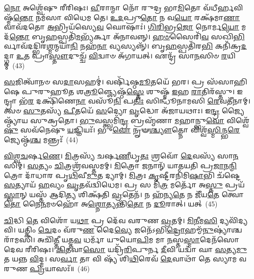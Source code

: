\-\ul{𑌨𑍋} 𑌅𑌶𑍍𑌵𑍇᳴𑌷𑍁 𑌰𑍀𑌰𑌿𑌷𑌃। \ul{𑌵𑍀}\-𑌰𑌾𑌨𑍍𑌮𑌾 𑌨𑍋᳴ 𑌰𑍁𑌦𑍍𑌰 𑌭𑌾\-\ul{𑌮𑌿}\-𑌤𑍋 𑌵᳴𑌧𑍀𑌰𑍍\mbox{}\-\ul{𑌹}\-𑌵𑌿𑌷𑍍𑌮᳴\-\ul{𑌨𑍍𑌤𑍋} 𑌨𑌮᳴𑌸𑌾 𑌵𑌿𑌧𑍇𑌮 𑌤𑍇। \ul{𑌉}\-\-\ul{𑌦}\-𑌪𑍍𑌰𑍁\-\ul{𑌤𑍋} 𑌨 𑌵\-\ul{𑌯𑍋} 𑌰𑌕𑍍𑌷᳴𑌮𑌾\-\ul{𑌣𑌾} 𑌵𑌾𑌵᳴𑌦𑌤𑍋 \ul{𑌅}\-𑌭𑍍𑌰𑌿𑌯᳴𑌸𑍍𑌯𑍇\-\ul{𑌵} 𑌘𑍋𑌷𑌾𑌃॑। \ul{𑌗𑌿}\-\-\ul{𑌰𑌿}\-𑌭𑍍𑌰\-\ul{𑌜𑍋} 𑌨𑍋𑌰𑍍𑌮\-\ul{𑌯𑍋} 𑌮𑌦᳴\-\ul{𑌨𑍍𑌤𑍋} 𑌬𑍃\-\ul{𑌹}\-𑌸𑍍𑌪𑌤𑌿᳴\-\ul{𑌮}\-𑌭𑍍𑌯᳴𑌰𑍍𑌕𑌾 𑌅᳴𑌨𑌾𑌵𑌨𑍍𑌨𑍍। \ul{𑌹}\-\-\ul{𑍞}\-𑌸𑍈𑌰𑌿᳴\-\ul{𑌵} 𑌸𑌖𑌿᳴\-\ul{𑌭𑌿}\-𑌰𑍍𑌵𑌾𑌵᳴𑌦𑌦𑍍𑌭𑌿𑌰\-\ul{𑌶𑍍𑌮}\-𑌨𑍍𑌮𑌯𑌾᳴\-\ul{𑌨𑌿} 𑌨𑌹᳴\-\ul{𑌨𑌾} 𑌵𑍍𑌯𑌸𑍍𑌯𑌨𑍍𑌨𑍍᳴। 𑌬𑍃\-\ul{𑌹}\-𑌸𑍍𑌪𑌤𑌿᳴𑌰\-\ul{𑌭𑌿} 𑌕𑌨𑌿᳴𑌕𑍍𑌰\-\ul{𑌦}\-𑌦𑍍𑌗𑌾 \ul{𑌉}\-𑌤 𑌪𑍍𑌰𑌾\-\ul{𑌸𑍍𑌤𑍗}\-𑌦𑍁𑌚𑍍𑌚᳴ \ul{𑌵𑌿}\-𑌦𑍍𑌵𑌾𑍞 𑌅᳴𑌗𑌾𑌯𑌤𑍍। 𑌏𑌨𑍍𑌦𑍍𑌰᳴ 𑌸𑌾\-\ul{𑌨}\-𑌸𑌿𑍞 \ul{𑌰}\-𑌯𑌿𑌮𑍍~(43)

\-\ul{𑌸}\-𑌜𑌿𑌤𑍍𑌵𑌾᳴𑌨𑍞 𑌸\-\ul{𑌦𑌾}\-𑌸𑌹𑌮𑍍॑। 𑌵𑌰𑍍\mbox{}𑌷𑌿᳴𑌷𑍍𑌠\-\ul{𑌮𑍂}\-𑌤𑌯𑍇᳴ 𑌭𑌰। 𑌪𑍍𑌰 𑌸᳴𑌸𑌾𑌹𑌿𑌷𑍇 𑌪𑍁𑌰𑍁𑌹𑍂\-\ul{𑌤} 𑌶\-\ul{𑌤𑍍𑌰𑍂}\-𑌞𑍍𑌜𑍍𑌯𑍇𑌷𑍍𑌠᳴\-\ul{𑌸𑍍𑌤𑍇} 𑌶𑍁𑌷𑍍𑌮᳴ \ul{𑌇}\-𑌹 \ul{𑌰𑌾}\-𑌤𑌿𑌰᳴𑌸𑍍𑌤𑍁। 𑌇𑌨𑍍𑌦𑍍𑌰𑌾 𑌭᳴\-\ul{𑌰} 𑌦𑌕𑍍𑌷𑌿᳴𑌣𑍇\-\ul{𑌨𑌾} 𑌵𑌸𑍂᳴\-\ul{𑌨𑌿} 𑌪\-\ul{𑌤𑌿𑌃} 𑌸𑌿𑌨𑍍𑌧𑍂᳴𑌨𑌾𑌮𑌸𑌿 \ul{𑌰𑍇}\-𑌵𑌤𑍀᳴𑌨𑌾𑌮𑍍। 𑌤𑍍𑌵𑍞 \ul{𑌸𑍁}\-𑌤𑌸𑍍𑌯᳴ \ul{𑌪𑍀}\-𑌤𑌯𑍇᳴ \ul{𑌸}\-𑌦𑍍𑌯𑍋 \ul{𑌵𑍃}\-𑌦𑍍𑌧𑍋 𑌅᳴𑌜𑌾𑌯𑌥𑌾𑌃। 𑌇\-\ul{𑌨𑍍𑌦𑍍𑌰} 𑌜𑍍𑌯𑍈𑌷𑍍𑌠𑍍𑌯𑌾᳴𑌯 𑌸𑍁𑌕𑍍𑌰𑌤𑍋। \ul{𑌭𑍁}\-𑌵𑌸𑍍𑌤𑍍𑌵𑌮𑌿᳴\-\ul{𑌨𑍍𑌦𑍍𑌰} 𑌬𑍍𑌰𑌹𑍍𑌮᳴𑌣𑌾 \ul{𑌮}\-𑌹𑌾𑌨𑍍𑌭𑍁\-\ul{𑌵𑍋} 𑌵𑌿𑌶𑍍𑌵𑍇᳴\-\ul{𑌷𑍁} 𑌸𑌵᳴𑌨𑍇𑌷𑍁 \ul{𑌯}\-𑌜𑍍𑌞𑌿𑌯𑌃᳴। 𑌭𑍁\-\ul{𑌵𑍋} 𑌨𑍄𑍟\-\ul{𑌶𑍍𑌚𑍍𑌯𑍗}\-𑌤𑍍𑌨𑍋 𑌵𑌿𑌶𑍍𑌵᳴\-\ul{𑌸𑍍𑌮𑌿}\-𑌨𑍍𑌭\-\ul{𑌰𑍇} 𑌜𑍍𑌯𑍇𑌷𑍍𑌠᳴\-\ul{𑌶𑍍𑌚} 𑌮𑌨𑍍𑌤𑍍𑌰𑌃᳴~(44)

\-\ul{𑌵𑌿}\-\-\ul{𑌶𑍍𑌵}\-\-\ul{𑌚}\-𑌰𑍍\mbox{}\-\ul{𑌷}\-\-\ul{𑌣𑍇}\-। \ul{𑌮𑌿}\-𑌤𑍍𑌰𑌸𑍍𑌯᳴ 𑌚𑌰𑍍\mbox{}𑌷\-\ul{𑌣𑍀}\-𑌧𑍃\-\ul{𑌤𑌃} 𑌶𑍍𑌰𑌵𑍋᳴ \ul{𑌦𑍇}\-𑌵𑌸𑍍𑌯᳴ 𑌸𑌾\-\ul{𑌨}\-𑌸𑌿𑌮𑍍। \ul{𑌸}\-𑌤𑍍𑌯𑌂 \ul{𑌚𑌿}\-𑌤𑍍𑌰𑌶𑍍𑌰᳴𑌵𑌸𑍍𑌤𑌮𑌮𑍍। \ul{𑌮𑌿}\-𑌤𑍍𑌰𑍋 𑌜𑌨𑌾𑌨𑍍᳴ 𑌯𑌾𑌤𑌯𑌤𑌿 𑌪𑍍𑌰\-\ul{𑌜𑌾}\-𑌨\-\ul{𑌨𑍍𑌮𑌿}\-𑌤𑍍𑌰𑍋 𑌦𑌾᳴𑌧𑌾𑌰 𑌪𑍃\-\ul{𑌥𑌿}\-𑌵𑍀\-\ul{𑌮𑍁}\-𑌤 𑌦𑍍𑌯𑌾𑌮𑍍। \ul{𑌮𑌿}\-𑌤𑍍𑌰𑌃 \ul{𑌕𑍃}\-𑌷𑍍𑌟𑍀𑌰𑌨𑌿᳴𑌮𑌿\-\ul{𑌷𑌾}\-𑌭𑌿 𑌚᳴𑌷𑍍𑌟𑍇 \ul{𑌸}\-𑌤𑍍𑌯𑌾𑌯᳴ \ul{𑌹}\-𑌵𑍍𑌯𑌂 \ul{𑌘𑍃}\-𑌤𑌵᳴𑌦𑍍𑌵𑌿𑌧𑍇𑌮। 𑌪𑍍𑌰 𑌸 𑌮𑌿᳴\-\ul{𑌤𑍍𑌰} 𑌮𑌰𑍍𑌤𑍋᳴ 𑌅\-\ul{𑌸𑍍𑌤𑍁} 𑌪𑍍𑌰𑌯᳴\-\ul{𑌸𑍍𑌵𑌾}\-𑌨𑍍 𑌯𑌸𑍍𑌤᳴ 𑌆𑌦𑌿\-\ul{𑌤𑍍𑌯} 𑌶𑌿𑌕𑍍𑌷᳴𑌤𑌿 \ul{𑌵𑍍𑌰}\-𑌤𑍇𑌨᳴। 𑌨 𑌹᳴𑌨𑍍𑌯\-\ul{𑌤𑍇} 𑌨 𑌜𑍀᳴𑌯\-\ul{𑌤𑍇} 𑌤𑍍𑌵𑍋\-\ul{𑌤𑍋} 𑌨𑍈\-\ul{𑌨}\-𑌮𑍞𑌹𑍋᳴ 𑌅\-\ul{𑌶𑍍𑌨𑍋}\-𑌤𑍍𑌯𑌨𑍍𑌤𑌿᳴\-\ul{𑌤𑍋} 𑌨 \ul{𑌦𑍂}\-𑌰𑌾𑌤𑍍। 𑌯𑌤𑍍~(45)

\-\ul{𑌚𑌿}\-𑌦𑍍𑌧𑌿 \ul{𑌤𑍇} 𑌵𑌿𑌶𑍋᳴ 𑌯\-\ul{𑌥𑌾} 𑌪𑍍𑌰 𑌦𑍇᳴𑌵 𑌵𑌰𑍁𑌣 \ul{𑌵𑍍𑌰}\-𑌤𑌮𑍍। \ul{𑌮𑌿}\-\-\ul{𑌨𑍀}\-𑌮\-\ul{𑌸𑌿} 𑌦𑍍𑌯𑌵𑌿᳴𑌦𑍍𑌯𑌵𑌿। 𑌯𑌤𑍍𑌕𑌿𑌂 \ul{𑌚𑍇}\-𑌦𑌂 𑌵᳴𑌰𑍁\-\ul{𑌣} 𑌦𑍈\-\ul{𑌵𑍍𑌯𑍇} 𑌜𑌨𑍇᳴\-𑌽𑌭𑌿\-\ul{𑌦𑍍𑌰𑍋}\-𑌹\-𑌮𑍍𑌮᳴\-\ul{𑌨𑍁}\-𑌷𑍍𑌯𑌾॑𑌶𑍍𑌚𑌰𑌾᳴𑌮𑌸𑌿। 𑌅𑌚𑌿᳴\-\ul{𑌤𑍍𑌤𑍀} 𑌯𑌤𑍍𑌤\-\ul{𑌵} 𑌧𑌰𑍍𑌮𑌾᳴ 𑌯𑍁𑌯𑍋\-\ul{𑌪𑌿}\-𑌮 𑌮𑌾 \ul{𑌨}\-𑌸𑍍𑌤\-\ul{𑌸𑍍𑌮𑌾}\-𑌦𑍇𑌨᳴𑌸𑍋 𑌦𑍇𑌵 𑌰𑍀𑌰𑌿𑌷𑌃। \ul{𑌕𑌿}\-\-\ul{𑌤}\-𑌵𑌾\-\ul{𑌸𑍋} 𑌯𑌦𑍍𑌰𑌿᳴\-\ul{𑌰𑌿}\-𑌪𑍁𑌰𑍍𑌨 \ul{𑌦𑍀}\-𑌵𑌿 𑌯𑌦𑍍𑌵𑌾᳴ 𑌘𑌾 \ul{𑌸}\-𑌤𑍍𑌯\-\ul{𑌮𑍁}\-𑌤 𑌯𑌨𑍍𑌨 \ul{𑌵𑌿}\-𑌦𑍍𑌮। 𑌸\-\ul{𑌰𑍍𑌵𑌾} 𑌤𑌾 𑌵𑌿 𑌷𑍍𑌯᳴ 𑌶𑌿\-\ul{𑌥𑌿}\-𑌰𑍇𑌵᳴ \ul{𑌦𑍇}\-𑌵𑌾𑌥𑌾᳴ 𑌤𑍇 𑌸𑍍𑌯𑌾𑌮 𑌵𑌰𑍁𑌣 \ul{𑌪𑍍𑌰𑌿}\-𑌯𑌾𑌸𑌃᳴॥~(46)

{\anuvakamend[{𑌸𑍋\-\ul{𑌮𑍋} 𑌗𑍋\-\ul{𑌷𑍁} 𑌮𑌾 \ul{𑌰}\-𑌯𑌿𑌂 𑌮\-\ul{𑌨𑍍𑌤𑍍𑌰𑍋} 𑌯𑌚𑍍𑌛𑌿᳴\-\ul{𑌥𑌿}\-𑌰𑌾 \ul{𑌸}\-𑌪𑍍𑌤 𑌚᳴}]}%

